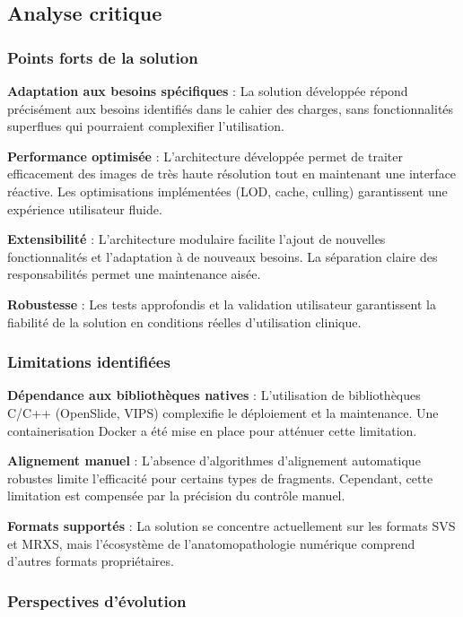 \documentclass[12pt,a4paper]{report}
\begin{document}
\begin{}
\begin{}
\begin{}
\begin{}
\subsection{Analyse critique}

\subsubsection{Points forts de la solution}

\textbf{Adaptation aux besoins spécifiques} : La solution développée répond précisément aux besoins identifiés dans le cahier des charges, sans fonctionnalités superflues qui pourraient complexifier l'utilisation.

\textbf{Performance optimisée} : L'architecture développée permet de traiter efficacement des images de très haute résolution tout en maintenant une interface réactive. Les optimisations implémentées (LOD, cache, culling) garantissent une expérience utilisateur fluide.

\textbf{Extensibilité} : L'architecture modulaire facilite l'ajout de nouvelles fonctionnalités et l'adaptation à de nouveaux besoins. La séparation claire des responsabilités permet une maintenance aisée.

\textbf{Robustesse} : Les tests approfondis et la validation utilisateur garantissent la fiabilité de la solution en conditions réelles d'utilisation clinique.

\subsubsection{Limitations identifiées}

\textbf{Dépendance aux bibliothèques natives} : L'utilisation de bibliothèques C/C++ (OpenSlide, VIPS) complexifie le déploiement et la maintenance. Une containerisation Docker a été mise en place pour atténuer cette limitation.

\textbf{Alignement manuel} : L'absence d'algorithmes d'alignement automatique robustes limite l'efficacité pour certains types de fragments. Cependant, cette limitation est compensée par la précision du contrôle manuel.

\textbf{Formats supportés} : La solution se concentre actuellement sur les formats SVS et MRXS, mais l'écosystème de l'anatomopathologie numérique comprend d'autres formats propriétaires.

\subsubsection{Perspectives d'évolution}


\end{}
\end{}
\end{}
\end{}
\end{document}
